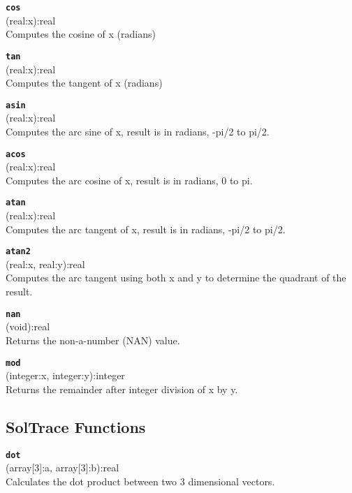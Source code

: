 \documentclass{article}
\begin{document}
{\large \texttt{\textbf{cos}}}\\
\textsf{ (real:x):real }\\
Computes the cosine of x (radians)

{\large \texttt{\textbf{tan}}}\\
\textsf{ (real:x):real }\\
Computes the tangent of x (radians)

{\large \texttt{\textbf{asin}}}\\
\textsf{ (real:x):real }\\
Computes the arc sine of x, result is in radians, -pi/2 to pi/2.

{\large \texttt{\textbf{acos}}}\\
\textsf{ (real:x):real }\\
Computes the arc cosine of x, result is in radians, 0 to pi.

{\large \texttt{\textbf{atan}}}\\
\textsf{ (real:x):real }\\
Computes the arc tangent of x, result is in radians, -pi/2 to pi/2.

{\large \texttt{\textbf{atan2}}}\\
\textsf{ (real:x, real:y):real }\\
Computes the arc tangent using both x and y to determine the quadrant of the result.

{\large \texttt{\textbf{nan}}}\\
\textsf{ (void):real }\\
Returns the non-a-number (NAN) value.

{\large \texttt{\textbf{mod}}}\\
\textsf{ (integer:x, integer:y):integer }\\
Returns the remainder after integer division of x by y.











\subsection{SolTrace Functions}
{\large \texttt{\textbf{dot}}}\\
\textsf{ (array[3]:a, array[3]:b):real }\\
Calculates the dot product between two 3 dimensional vectors.\\
\end{document}
